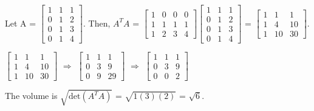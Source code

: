     \begin{tbox}
        Let A =
        $\begin{bmatrix}
            1 & 1 & 1 \\
            0 & 1 & 2 \\
            0 & 1 & 3 \\
            0 & 1 & 4
        \end{bmatrix}$.
        Then,
        $A^TA$ =
        $\begin{bmatrix}
            1 & 0 & 0 & 0 \\ 
            1 & 1 & 1 & 1 \\
            1 & 2 & 3 & 4
        \end{bmatrix}
        \begin{bmatrix}
            1 & 1 & 1 \\
            0 & 1 & 2 \\
            0 & 1 & 3 \\
            0 & 1 & 4
        \end{bmatrix}$ =
        $\begin{bmatrix}
            1 & 1 & 1 \\
            1 & 4 & 10 \\
            1 & 10 & 30
        \end{bmatrix}$.

        \hspace{0.5cm}
        $\begin{bmatrix}
            1 & 1 & 1 \\
            1 & 4 & 10 \\
            1 & 10 & 30
        \end{bmatrix}$
        $\Rightarrow$
        $\begin{bmatrix}
            1 & 1 & 1 \\
            0 & 3 & 9 \\
            0 & 9 & 29
        \end{bmatrix}$
        $\Rightarrow$
        $\begin{bmatrix}
            1 & 1 & 1 \\
            0 & 3 & 9 \\
            0 & 0 & 2
        \end{bmatrix}$

        The volume is
        $\sqrt{\text{det}(A^TA)}$
        = $\sqrt{1(3)(2)}$
        = $\sqrt{6}$.
    \end{tbox}




